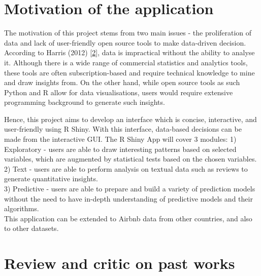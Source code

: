 \documentclass{acm_proc_article-sp}
\begin{document}
\hypertarget{motivation-of-the-application}{%
\section{Motivation of the
application}\label{motivation-of-the-application}}

The motivation of this project stems from two main issues - the
proliferation of data and lack of user-friendly open source tools to
make data-driven decision. According to Harris (2012)
{[}\protect\hyperlink{ref-harris_2014}{2}{]}, data is impractical
without the ability to analyse it. Although there is a wide range of
commercial statistics and analytics tools, these tools are often
subscription-based and require technical knowledge to mine and draw
insights from. On the other hand, while open source tools as such Python
and R allow for data visualisations, users would require extensive
programming background to generate such insights.

Hence, this project aims to develop an interface which is concise,
interactive, and user-friendly using R Shiny. With this interface,
data-based decisions can be made from the interactive GUI. The R Shiny
App will cover 3 modules: 1) Exploratory - users are able to draw
interesting patterns based on selected variables, which are augmented by
statistical tests based on the chosen variables. 2) Text - users are
able to perform analysis on textual data such as reviews to generate
quantitative insights.\\
3) Predictive - users are able to prepare and build a variety of
prediction models without the need to have in-depth understanding of
predictive models and their algorithms.\\
This application can be extended to Airbnb data from other countries,
and also to other datasets.

\hypertarget{review-and-critic-on-past-works}{%
\section{Review and critic on past
works}\label{review-and-critic-on-past-works}}
\end{document}
